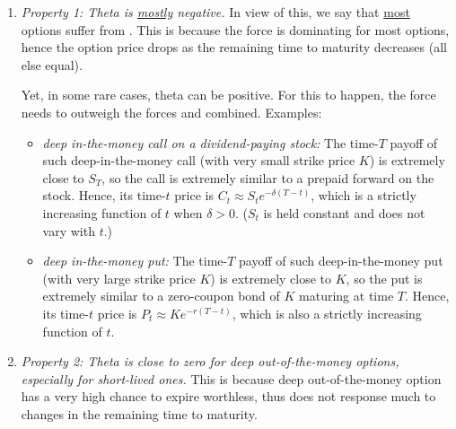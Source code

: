 \begin{enumerate}
\item \emph{Property 1: Theta is \underline{mostly} negative.} In view of this,
we say that \underline{most} options suffer from . This is
because the force  is dominating for most
options, hence the option price drops as the remaining time to maturity
decreases (all else equal).

\begin{center}
\end{center}

Yet, in some rare cases, theta can be positive. For this to happen, the force
 needs to outweigh the forces
 and  combined.
Examples:
\begin{itemize}
\item \emph{deep in-the-money call on a dividend-paying stock:} The time-\(T\)
payoff of such deep-in-the-money call (with very small strike price \(K\)) is
extremely close to \(S_T\), so the call is extremely similar to a prepaid
forward on the stock.  Hence, its time-\(t\) price is \(C_t\approx
S_te^{-\delta(T-t)}\), which is a strictly increasing function of \(t\) when
\(\delta>0\). (\(S_t\) is held constant and does not vary with \(t\).)

\item \emph{deep in-the-money put:} The time-\(T\) payoff of such
deep-in-the-money put (with very large strike price \(K\)) is extremely close
to \(K\), so the put is extremely similar to a zero-coupon bond of \(K\)
maturing at time \(T\).  Hence, its time-\(t\) price is \(P_t\approx
Ke^{-r(T-t)}\), which is also a strictly increasing function of \(t\).
\end{itemize}

\item \emph{Property 2: Theta is close to zero for deep out-of-the-money
options, especially for short-lived ones.} This is because deep
out-of-the-money option has a very high chance to expire worthless, thus does
not response much to changes in the remaining time to maturity.


\end{enumerate}
